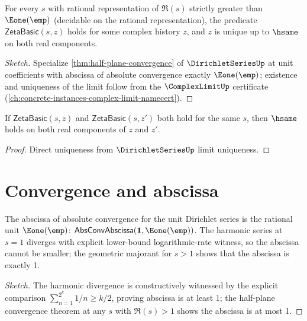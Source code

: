 \begin{lemma}
\label{lem:zeta-basic-well-defined}
For every \(s\) with rational representation of \(\Re(s)\) strictly greater than \(\Eone(\emp)\) (decidable on the rational representation), the predicate \(\mathsf{ZetaBasic}(s, z)\) holds for some complex history \(z\), and \(z\) is unique up to \(\hsame\) on both real components.
\end{lemma}
\begin{proof}[Sketch]
Specialize \autoref{thm:half-plane-convergence} of \(\DirichletSeriesUp\) at unit coefficients with abscissa of absolute convergence exactly \(\Eone(\emp)\); existence and uniqueness of the limit follow from the \(\ComplexLimitUp\) certificate (\autoref{ch:concrete-instances-complex-limit-namecert}).
\end{proof}

\begin{theorem}
\label{thm:zeta-basic-unique}
If \(\mathsf{ZetaBasic}(s, z)\) and \(\mathsf{ZetaBasic}(s, z')\) both hold for the same \(s\), then \(\hsame\) holds on both real components of \(z\) and \(z'\).
\end{theorem}
\begin{proof}
Direct uniqueness from \(\DirichletSeriesUp\) limit uniqueness.
\end{proof}

\section{Convergence and abscissa}

\begin{theorem}
\label{thm:zeta-abscissa-one}
The abscissa of absolute convergence for the unit Dirichlet series is the rational unit \(\Eone(\emp)\): \(\mathsf{AbsConvAbscissa}(\mathbf{1}, \Eone(\emp))\). The harmonic series at \(s = 1\) diverges with explicit lower-bound logarithmic-rate witness, so the abscissa cannot be smaller; the geometric majorant for \(s > 1\) shows that the abscissa is exactly 1.
\end{theorem}
\begin{proof}[Sketch]
The harmonic divergence is constructively witnessed by the explicit comparison \(\sum_{n=1}^{2^k} 1/n \geq k/2\), proving abscissa is at least 1; the half-plane convergence theorem at any \(s\) with \(\Re(s) > 1\) shows the abscissa is at most 1.
\end{proof}


